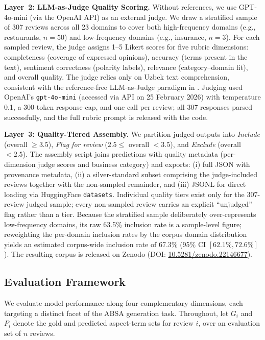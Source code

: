 \documentclass[bdcc,article,submit,moreauthors]{Definitions/mdpi}
\begin{document}
\textbf{Layer~2: LLM-as-Judge Quality Scoring.} Without references, we use GPT-4o-mini (via the OpenAI API) as an external judge. We draw a stratified sample of 307 reviews across all 23 domains to cover both high-frequency domains (e.g., restaurants, $n{=}50$) and low-frequency domains (e.g., insurance, $n{=}3$). For each sampled review, the judge assigns 1--5 Likert scores for five rubric dimensions: completeness (coverage of expressed opinions), accuracy (terms present in the text), sentiment correctness (polarity labels), relevance (category--domain fit), and overall quality. The judge relies only on Uzbek text comprehension, consistent with the reference-free LLM-as-Judge paradigm in . Judging used OpenAI's \texttt{gpt-4o-mini} (accessed via API on 25 February 2026) with temperature 0.1, a 300-token response cap, and one call per review; all 307 responses parsed successfully, and the full rubric prompt is released with the code.

\textbf{Layer~3: Quality-Tiered Assembly.} We partition judged outputs into \emph{Include} (overall $\geq 3.5$), \emph{Flag for review} ($2.5 \leq$ overall $< 3.5$), and \emph{Exclude} (overall $< 2.5$). The assembly script joins predictions with quality metadata (per-dimension judge scores and business category) and exports: (i) full JSON with provenance metadata, (ii) a silver-standard subset comprising the judge-included reviews together with the non-sampled remainder, and (iii) JSONL for direct loading via HuggingFace \texttt{datasets}. Individual quality tiers exist only for the 307-review judged sample; every non-sampled review carries an explicit ``unjudged'' flag rather than a tier. Because the stratified sample deliberately over-represents low-frequency domains, its raw 63.5\% inclusion rate is a sample-level figure; reweighting the per-domain inclusion rates by the corpus domain distribution yields an estimated corpus-wide inclusion rate of 67.3\% (95\% CI $[62.1\%, 72.6\%]$). The resulting corpus is released on Zenodo (DOI: \href{https://doi.org/10.5281/zenodo.22146677}{10.5281/zenodo.22146677}).
\subsection{Evaluation Framework}
\label{sec:meth_eval}

We evaluate model performance along four complementary dimensions, each targeting a distinct facet of the ABSA generation task. Throughout, let $G_i$ and $P_i$ denote the gold and predicted aspect-term sets for review $i$, over an evaluation set of $n$ reviews.
\end{document}
